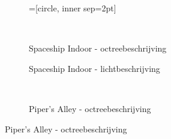 \begin{figure}[t]
  \hspace{0.05\textwidth}%
  \begin{subfigure}[b]{\textwidth}
    =[circle, inner sep=2pt]
    
  \end{subfigure}\hfill\\
  \begin{adjustbox}{minipage=\textwidth, scale=0.55}
    \begin{subfigure}[b]{0.8\textwidth}
      \centering
      \def\svgwidth{\textwidth}
      
      \caption{Spaceship Indoor - octreebeschrijving}
      \vspace{4pt}
      \label{fig:hs-layered-mem:indoor-octree}
    \end{subfigure}
  \end{adjustbox} %
  \begin{adjustbox}{minipage=\textwidth, scale=0.55}
    \begin{subfigure}[b]{0.8\textwidth}
      \centering
      \def\svgwidth{\textwidth}
      
      \caption{Spaceship Indoor - lichtbeschrijving}
      \vspace{4pt}
      \label{fig:hs-layered-mem:indoor-data}
    \end{subfigure}
  \end{adjustbox} \\
  \begin{adjustbox}{minipage=\textwidth, scale=0.55}
    \begin{subfigure}[b]{0.8\textwidth}
      \centering
      \def\svgwidth{\textwidth}
      
      \caption{Piper's Alley - octreebeschrijving}
      \label{fig:hs-layered-mem:alley-octree}

\end{subfigure}
\end{adjustbox}
\end{figure}
